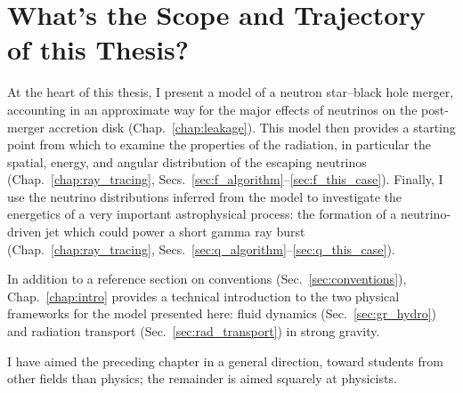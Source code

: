 \section{What's the Scope and Trajectory of this Thesis?}
\label{sec:scope}

At the heart of this thesis, I present a model of a neutron star--black hole merger,
accounting in an approximate way for the major effects of neutrinos on the
post-merger accretion disk (Chap.~\ref{chap:leakage}).
This model then provides a starting point from which to examine the properties of
the radiation, in particular the spatial, energy, and angular distribution of the
escaping neutrinos
(Chap.~\ref{chap:ray_tracing}, Secs.~\ref{sec:f_algorithm}--\ref{sec:f_this_case}).
Finally, I use the neutrino distributions inferred from the model to investigate
the energetics of a very important astrophysical process: the formation of a
neutrino-driven jet which could power a short gamma ray burst
(Chap.~\ref{chap:ray_tracing}, Secs.~\ref{sec:q_algorithm}--\ref{sec:q_this_case}).

In addition to a reference section on conventions (Sec.~\ref{sec:conventions}),
Chap.~\ref{chap:intro} provides a technical introduction to the two physical
frameworks for the model presented here:
fluid dynamics (Sec.~\ref{sec:gr_hydro}) and
radiation transport (Sec.~\ref{sec:rad_transport})
in strong gravity.

I have aimed the preceding chapter in a general direction, toward students from
other fields than physics; the remainder is aimed squarely at physicists.
